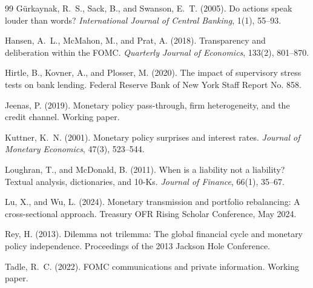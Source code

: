 \documentclass[12pt,a4paper]{article}
\begin{document}
\begin{thebibliography}{99}
G\"urkaynak, R.~S., Sack, B., and Swanson, E.~T. (2005). Do actions speak louder than words? \textit{International Journal of Central Banking}, 1(1), 55--93.

Hansen, A.~L., McMahon, M., and Prat, A. (2018). Transparency and deliberation within the FOMC. \textit{Quarterly Journal of Economics}, 133(2), 801--870.

Hirtle, B., Kovner, A., and Plosser, M. (2020). The impact of supervisory stress tests on bank lending. Federal Reserve Bank of New York Staff Report No. 858.

Jeenas, P. (2019). Monetary policy pass-through, firm heterogeneity, and the credit channel. Working paper.

Kuttner, K.~N. (2001). Monetary policy surprises and interest rates. \textit{Journal of Monetary Economics}, 47(3), 523--544.

Loughran, T., and McDonald, B. (2011). When is a liability not a liability? Textual analysis, dictionaries, and 10-Ks. \textit{Journal of Finance}, 66(1), 35--67.

Lu, X., and Wu, L. (2024). Monetary transmission and portfolio rebalancing: A cross-sectional approach. Treasury OFR Rising Scholar Conference, May 2024.

Rey, H. (2013). Dilemma not trilemma: The global financial cycle and monetary policy independence. Proceedings of the 2013 Jackson Hole Conference.

Tadle, R.~C. (2022). FOMC communications and private information. Working paper.

\end{thebibliography}
\end{document}
